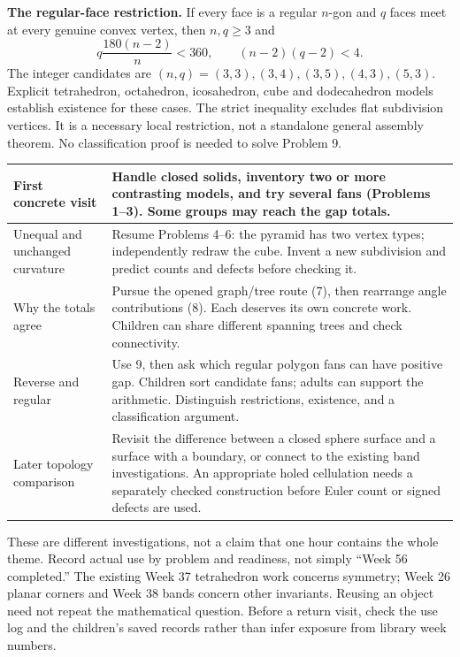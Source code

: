 \documentclass[11pt,letterpaper]{article}
\newcommand{\sub}[1]{\par\vspace{3pt}{\bfseries #1}\par}
\begin{document}
\textbf{The regular-face restriction.} If every face is a regular $n$-gon and $q$ faces meet at every genuine convex vertex, then $n,q\geq3$ and
\[
q\frac{180(n-2)}{n}<360,\qquad (n-2)(q-2)<4.
\]
The integer candidates are $(n,q)=(3,3),(3,4),(3,5),(4,3),(5,3)$. Explicit tetrahedron, octahedron, icosahedron, cube and dodecahedron models establish existence for these cases. The strict inequality excludes flat subdivision vertices. It is a necessary local restriction, not a standalone general assembly theorem. No classification proof is needed to solve Problem 9.

\sub{Several visits from this theme}
\begin{tabularx}{\linewidth}{|p{3.4cm}|Y|}\hline
First concrete visit & Handle closed solids, inventory two or more contrasting models, and try several fans (Problems 1--3). Some groups may reach the gap totals.\\\hline
Unequal and unchanged curvature & Resume Problems 4--6: the pyramid has two vertex types; independently redraw the cube. Invent a new subdivision and predict counts and defects before checking it.\\\hline
Why the totals agree & Pursue the opened graph/tree route (7), then rearrange angle contributions (8). Each deserves its own concrete work. Children can share different spanning trees and check connectivity.\\\hline
Reverse and regular & Use 9, then ask which regular polygon fans can have positive gap. Children sort candidate fans; adults can support the arithmetic. Distinguish restrictions, existence, and a classification argument.\\\hline
Later topology comparison & Revisit the difference between a closed sphere surface and a surface with a boundary, or connect to the existing band investigations. An appropriate holed cellulation needs a separately checked construction before Euler count or signed defects are used.\\\hline
\end{tabularx}
These are different investigations, not a claim that one hour contains the whole theme. Record actual use by problem and readiness, not simply ``Week 56 completed.'' The existing Week 37 tetrahedron work concerns symmetry; Week 26 planar corners and Week 38 bands concern other invariants. Reusing an object need not repeat the mathematical question. Before a return visit, check the use log and the children's saved records rather than infer exposure from library week numbers.
\end{document}
